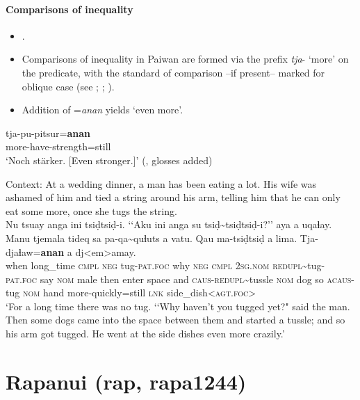 \paragraph{Comparisons of inequality}\label{appendixPaiwanComparisons}
\begin{itemize}
	\item \textcite[164]{Egli1990}.
	\item Comparisons of inequality in Paiwan are formed via the prefix \mbox{\textit{tja}-} \lq more' on the predicate, with the standard of comparison –if present– marked for oblique case (see \cite[149, 167]{Egli1990}; \cite[26]{Ferrell1982}; \cite[219]{Huang2012}).
	\item Addition of \mbox{=\textit{anan}} yields \lq even more\rq{}.
\end{itemize}

\begin{exe}
	\ex
	\gll tja-pu-pitsur=\textbf{anan}\\
	more-have-strength=still\\
	\glt \lq Noch stärker. [Even stronger.]\rq{ }(\cite[164]{Egli1990}, glosses added)
	
	\ex 
	Context: At a wedding dinner, a man has been eating a lot. His wife was ashamed of him and tied a string around his arm, telling him that he can only eat some more, once she tugs the string.\\
	\gll Nu tsuay anga ini tsiḍtsiḍ-i. \lq\lq{}Aku ini anga su tsiḍ\sim{}tsiḍtsiḍ-i?\rq\rq{} aya a uqaɬay. Manu tjemala tideq sa pa-qa\sim{}quɬuts a vatu. Qau ma-tsiḍtsiḍ a lima. Tja-djaɬaw=\textbf{anan} a dj<em>amay.\\
	when long\_time \textsc{cmpl} \textsc{neg} tug-\textsc{pat}.\textsc{foc} \phantom{\lq\lq}why \textsc{neg} \textsc{cmpl} 2\textsc{sg}.\textsc{nom} \textsc{redupl}\sim{}tug-\textsc{pat}.\textsc{foc} say \textsc{nom} male then enter space and \textsc{caus}-\textsc{redupl}\sim{}tussle \textsc{nom} dog so \textsc{acaus}-tug \textsc{nom} hand more-quickly=still \textsc{lnk} side\_dish<\textsc{agt}.\textsc{foc}>\\
	\glt \lq For a long time there was no tug. \lq\lq Why haven’t you tugged yet?" said the man. Then some dogs came into the space between them and started a tussle; and so his arm got tugged. He went at the side dishes even more crazily.' \parencite[46–47]{EarlyWhitehorn2003}
\end{exe}

\section{Rapanui (rap, rapa1244)}\label{appendixRapanui}
